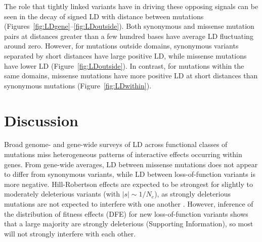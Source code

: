 \documentclass[]{article}
\begin{document}
The role that tightly linked variants have in driving these opposing signals
can be seen in the decay of signed LD with distance between mutations
(Figures~\ref{fig:LDgene}--\ref{fig:LDoutside}). Both synonymous and missense
mutation pairs at distances greater than a few hundred bases have average
LD fluctuating around zero. However, for mutations outside domains,
synonymous variants separated by short distances have large positive LD, while
missense mutations have lower LD (Figure~\ref{fig:LDoutside}). In contrast, for
mutations within the same domains, missense mutations have more positive LD at
short distances than synonymous mutations (Figure~\ref{fig:LDwithin}).

\section{Discussion}\label{sec:discussion}


Broad genome- and gene-wide surveys of LD across functional classes of
mutations miss heterogeneous patterns of interactive effects occurring within
genes.
From gene-wide averages, LD between missense
mutations does not appear to differ from synonymous variants,
while LD between loss-of-function variants is more negative. Hill-Robertson
effects are expected to be strongest for slightly to moderately deleterious
variants (with \(|s|\sim 1/N_e\)), as strongly deleterious mutations are not
expected to interfere with one another \citep{McVean2000-ox}. However,
inference of the distribution of fitness effects (DFE) for new loss-of-function
variants shows that a large majority are strongly deleterious (Supporting
Information), so most will not strongly interfere with each other.
\end{document}
